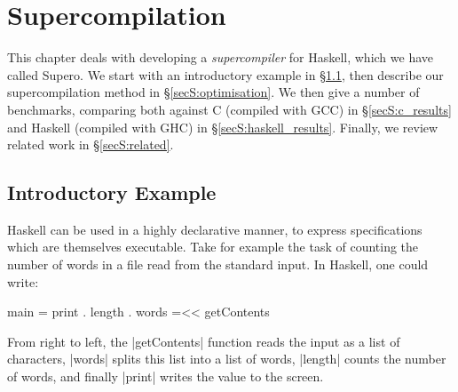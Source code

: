 \chapter{Supercompilation}
\label{chp:supero}

This chapter deals with developing a \textit{supercompiler} for Haskell, which we have called Supero. We start with an introductory example in \S\ref{secS:intro_supero}, then describe our supercompilation method in \S\ref{secS:optimisation}. We then give a number of benchmarks, comparing both against C (compiled with GCC) in \S\ref{secS:c_results} and Haskell (compiled with GHC) in \S\ref{secS:haskell_results}. Finally, we review related work in \S\ref{secS:related}.

\section{Introductory Example}
\label{secS:intro_supero}

Haskell \cite{haskell} can be used in a highly declarative manner, to express specifications which are themselves executable. Take for example the task of counting the number of words in a file read from the standard input. In Haskell, one could write:

\begin{code}
main = print . length . words =<< getContents
\end{code}

From right to left, the |getContents| function reads the input as a list of characters, |words| splits this list into a list of words, |length| counts the number of words, and finally |print| writes the value to the screen.

